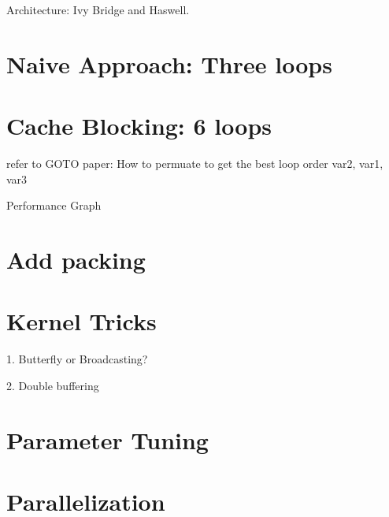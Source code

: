 Architecture: Ivy Bridge and Haswell.

\section{Naive Approach: Three loops}



\section{Cache Blocking: 6 loops}

refer to GOTO paper: How to permuate to get the best loop order
var2, var1, var3


Performance Graph

\section{Add packing}


\section{Kernel Tricks}
1. Butterfly or Broadcasting?

2. Double buffering



\section{Parameter Tuning}




\section{Parallelization}







